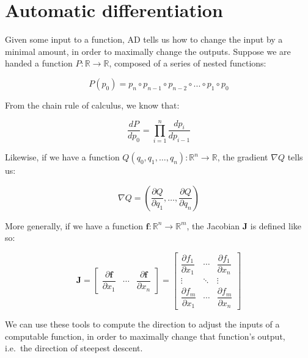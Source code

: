 \documentclass[12pt,initial,twoside,maitrise]{dms}
\numberwithin{equation}{section}
\numberwithin{table}{chapter}
\numberwithin{figure}{chapter}
\begin{document}
\section{Automatic differentiation}\label{sec:automatic-differentiation}

Given some input to a function, AD tells us how to change the input by a minimal amount, in order to maximally change the outputs. Suppose we are handed a function $P: \mathbb{R}\rightarrow\mathbb{R}$, composed of a series of nested functions:

%
\begin{equation}
    P(p_0)=p_n \circ p_{n-1} \circ p_{n-2} \circ ... \circ p_1 \circ p_0
\end{equation}
%

\noindent From the chain rule of calculus, we know that:

%
\begin{equation}
    \frac{dP}{dp_0} = {\displaystyle \prod_{i=1}^{n} \frac{dp_{i}}{dp_{i-1}}}
\end{equation}


\noindent Likewise, if we have a function $Q(q_0, q_1, \dots, q_n):  \mathbb{R}^n\rightarrow\mathbb{R}$, the gradient $\nabla Q$ tells us:

\begin{equation}
    \nabla Q = \left( \frac{\partial Q}{\partial q_1}, \dots, \frac{\partial Q}{\partial q_n}\right)
\end{equation}

\noindent More generally, if we have a function $\mathbf{f}:  \mathbb{R}^n\rightarrow\mathbb{R}^m$, the Jacobian $\mathbf J$ is defined like so:

\begin{equation}
\mathbf J = \begin{bmatrix}
                       \dfrac{\partial \mathbf{f}}{\partial x_1} & \cdots & \dfrac{\partial \mathbf{f}}{\partial x_n} \end{bmatrix}
= \begin{bmatrix}
      \dfrac{\partial f_1}{\partial x_1} & \cdots & \dfrac{\partial f_1}{\partial x_n}\\
      \vdots & \ddots & \vdots\\
      \dfrac{\partial f_m}{\partial x_1} & \cdots & \dfrac{\partial f_m}{\partial x_n} \end{bmatrix}
\end{equation}

\noindent We can use these tools to compute the direction to adjust the inputs of a computable function, in order to maximally change that function's output, i.e.\ the direction of steepest descent.
\end{document}
